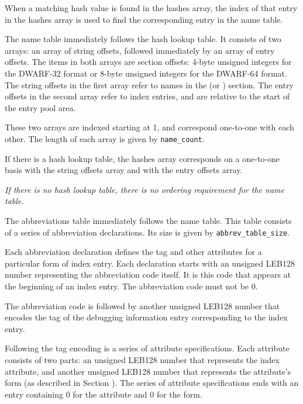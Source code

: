 When a matching hash value is found in the hashes array, the index of
that entry in the hashes array is used to find the corresponding entry
in the name table.

\label{chap:nametable}
The name table immediately follows the hash lookup table. It
consists of two arrays: an array of string offsets, followed
immediately by an array of entry offsets. The items in both
arrays are section offsets: 4-byte unsigned integers for the
DWARF-32 format or 8-byte unsigned integers for the DWARF-64
format. The string offsets in the first array refer to names in
the \dotdebugstr{} (or \dotdebugstrdwo) section. The entry offsets
in the second array refer to index entries, and are relative to
the start of the entry pool area.

These two arrays are indexed starting at 1, and correspond 
one-to-one with each other. The length of each array is
given by \texttt{name\_count}.

If there is a hash lookup table, the hashes array corresponds on
a one-to-one basis with the string offsets array and with the
entry offsets array.

\textit{If there is no hash lookup table, there is no ordering
requirement for the name table.}

The abbreviations table immediately follows the name table. This table
consists of a series of abbreviation declarations. Its size is given
by \texttt{abbrev\_table\_size}.

Each abbreviation declaration defines the tag and other attributes for
a particular form of index entry. Each declaration starts with an
unsigned LEB128 number representing the abbreviation code itself. It
is this code that appears at the beginning of an index entry. The
abbreviation code must not be 0.

The abbreviation code is followed by another unsigned LEB128 number
that encodes the tag of the debugging information entry corresponding
to the index entry.

Following the tag encoding is a series of attribute specifications.
Each attribute consists of two parts: an unsigned LEB128 number that
represents the index attribute, and another unsigned LEB128 number
that represents the attribute's form (as described in 
Section ). The series of attribute 
specifications ends with an entry containing 0 for the attribute and 
0 for the form.

